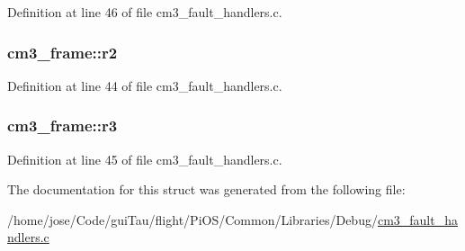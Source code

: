 Definition at line 46 of file cm3\-\_\-fault\-\_\-handlers.\-c.

\hypertarget{structcm3__frame_a8777f448e55dd8b65d3d0287464677cb}{
\subsubsection[{r2}]{ cm3\-\_\-frame\-::r2}}\label{structcm3__frame_a8777f448e55dd8b65d3d0287464677cb}


Definition at line 44 of file cm3\-\_\-fault\-\_\-handlers.\-c.

\hypertarget{structcm3__frame_ab5455c3ad56bb80375a224fd34f0b1dd}{
\subsubsection[{r3}]{ cm3\-\_\-frame\-::r3}}\label{structcm3__frame_ab5455c3ad56bb80375a224fd34f0b1dd}


Definition at line 45 of file cm3\-\_\-fault\-\_\-handlers.\-c.



The documentation for this struct was generated from the following file\-:\begin{DoxyCompactItemize}
\item 
/home/jose/\-Code/gui\-Tau/flight/\-Pi\-O\-S/\-Common/\-Libraries/\-Debug/\hyperlink{cm3__fault__handlers_8c}{cm3\-\_\-fault\-\_\-handlers.\-c}\end{DoxyCompactItemize}
